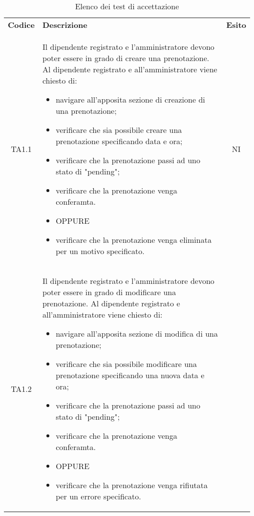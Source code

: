 {
    \renewcommand{\arraystretch}{1.5}
    \centering
    \begin{longtable}{ c C{11cm} c }
        \caption{Elenco dei test di accettazione}\\
        \rowcolor{\primaryColor}
        \textcolor{\secondaryColor}{
        \textbf{Codice}}     & \textcolor{\secondaryColor}
        {\textbf{Descrizione}} & \textcolor{\secondaryColor}{\textbf{Esito}} \\

        TA1.1&
        Il dipendente registrato e l'amministratore devono poter essere in grado di creare una prenotazione.\newline
        Al dipendente registrato e all'amministratore viene chiesto di:
        \begin{itemize}
            \item navigare all'apposita sezione di creazione di una prenotazione;
            \item verificare che sia possibile creare una prenotazione specificando data e ora;
            \item verificare che la prenotazione passi ad uno stato di "pending";
            \item verificare che la prenotazione venga conferamta.
            \item [] OPPURE
            \item verificare che la prenotazione venga eliminata per un motivo specificato.
        \end{itemize}&
        NI\\
        TA1.2&
        Il dipendente registrato e l'amministratore devono poter essere in grado di modificare una prenotazione.\newline
        Al dipendente registrato e all'amministratore viene chiesto di:
        \begin{itemize}
            \item navigare all'apposita sezione di modifica di una prenotazione;
            \item verificare che sia possibile modificare una prenotazione specificando una nuova data e ora;
            \item verificare che la prenotazione passi ad uno stato di "pending";
            \item verificare che la prenotazione venga conferamta.
            \item [] OPPURE
            \item verificare che la prenotazione venga rifiutata per un errore specificato.

\end{itemize}
\end{longtable}}
